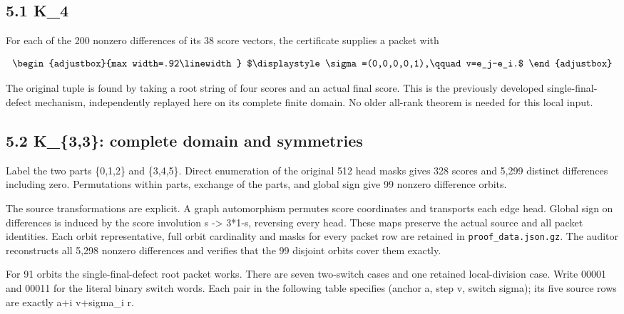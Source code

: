 \subsection{5.1 K\_4}\label{n16-k_4}

For each of the 200 nonzero differences of its 38 score vectors, the certificate supplies a packet with

\[
\begin{adjustbox}{max width=.92\linewidth}
$\displaystyle \sigma=(0,0,0,0,1),\qquad v=e_j-e_i.$
\end{adjustbox}
\]

The original tuple is found by taking a root string of four scores and an actual final score. This is the previously developed single-final-defect mechanism, independently replayed here on its complete finite domain. No older all-rank theorem is needed for this local input.

\subsection{5.2 K\_\{3,3\}: complete domain and symmetries}\label{n16-k_33-complete-domain-and-symmetries}

Label the two parts \{0,1,2\} and \{3,4,5\}. Direct enumeration of the original 512 head masks gives 328 scores and 5,299 distinct differences including zero. Permutations within parts, exchange of the parts, and global sign give 99 nonzero difference orbits.

The source transformations are explicit. A graph automorphism permutes score coordinates and transports each edge head. Global sign on differences is induced by the score involution s -\textgreater{} 3*1-s, reversing every head. These maps preserve the actual source and all packet identities. Each orbit representative, full orbit cardinality and masks for every packet row are retained in \texttt{proof\_data.json.gz}. The auditor reconstructs all 5,298 nonzero differences and verifies that the 99 disjoint orbits cover them exactly.

For 91 orbits the single-final-defect root packet works. There are seven two-switch cases and one retained local-division case. Write 00001 and 00011 for the literal binary switch words. Each pair in the following table specifies (anchor a, step v, switch sigma); its five source rows are exactly a+i v+sigma\_i r.

